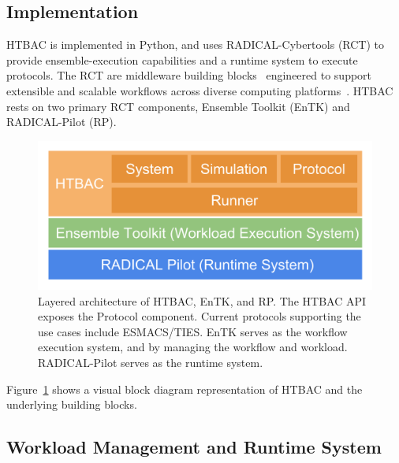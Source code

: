 
\subsection{Implementation}

HTBAC is implemented in Python, and uses RADICAL-Cybertools (RCT) to provide 
ensemble-execution capabilities and a runtime system to execute protocols. 
The RCT are middleware building blocks~\cite{review_bb_2016} engineered to 
support extensible and scalable workflows across diverse computing
platforms~\cite{turilli2017comprehensive}. HTBAC rests on two primary RCT 
components, Ensemble Toolkit (EnTK) and RADICAL-Pilot (RP). 

\begin{figure}
  \centering
   \includegraphics[width=\columnwidth]{figures/htbac_workflow.png}
  \caption{Layered architecture of HTBAC, EnTK, and RP. The HTBAC API exposes 
  the Protocol component. Current protocols supporting the use cases include 
  ESMACS/TIES. EnTK serves as the workflow execution system, and by managing 
  the workflow and workload. RADICAL-Pilot serves as the runtime system.}
\label{fig:blockdiagram}
\end{figure}

Figure~\ref{fig:blockdiagram} shows a visual block diagram representation of 
HTBAC and the underlying building blocks. 

\subsection{Workload Management and Runtime System}

